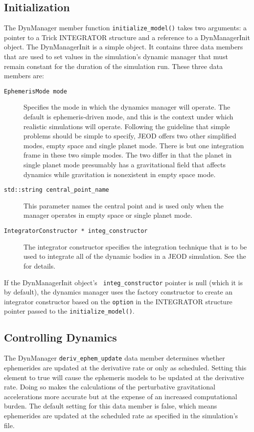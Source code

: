 \subsection{Initialization}\label{sec:user_analysis_initialization}
The DynManager member function \verb+initialize_model()+ takes two arguments:
a pointer to a Trick INTEGRATOR structure
and a reference to a DynManagerInit object.
The DynManagerInit is a simple object. It contains three data members that
are used to set values in the simulation's dynamic manager that must
remain constant for the duration of the simulation run. These three data
members are:\begin{description}
\item[{\tt EphemerisMode mode}]
  Specifies the mode in which the dynamics manager will operate.
  The default is ephemeris-driven mode, and this is the context under which
  realistic simulations will operate. Following the guideline that simple
  problems should be simple to specify, JEOD offers two other simplified modes,
  empty space and single planet mode. There is but one integration frame
  in these two simple modes. The two differ in that the planet in single
  planet mode presumably has a gravitational field that affects dynamics
  while gravitation is nonexistent in empty space mode.
\item[{\tt std::string central\_point\_name}]
  This parameter names the central point and is used only when the manager
  operates in empty space or single planet mode.
\item[{\tt IntegratorConstructor * integ\_constructor}]
  The integrator constructor specifies the integration technique that is
  to be used to integrate all of the dynamic bodies in a JEOD simulation.
  See the  for details.
\end{description}

If the DynManagerInit object's \verb+ integ_constructor+ pointer is null
(which it is by default), the dynamics manager uses the \INTEGRATION factory constructor to create an integrator constructor based on the \verb+option+
in the INTEGRATOR structure pointer passed to the \verb+initialize_model()+.

\subsection{Controlling Dynamics}\label{sec:user_analysis_dynamics}
The DynManager \verb+deriv_ephem_update+ data member determines whether
ephemerides are updated at the derivative rate or only as scheduled.
Setting this element to true will cause the ephemeris models to be updated at
the derivative rate. Doing so makes the calculations of the perturbative
gravitational accelerations more accurate but at the expense of an increased
computational burden. The default setting for this data member is false,
which means ephemerides are updated at the scheduled rate as specified
in the simulation's \Sdefine file.

